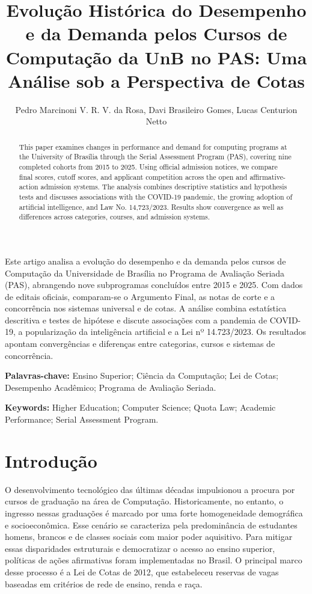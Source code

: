 \documentclass[12pt]{article}
\title{Evolução Histórica do Desempenho e da Demanda pelos Cursos de Computação da UnB no PAS: Uma Análise sob a Perspectiva de Cotas}
\author{Pedro Marcinoni V. R. V. da Rosa\inst{1}, Davi Brasileiro Gomes\inst{1}, Lucas Centurion Netto\inst{1}}
\begin{document}
\maketitle

\begin{abstract}
This paper examines changes in performance and demand for computing programs at the University of Brasília through the Serial Assessment Program (PAS), covering nine completed cohorts from 2015 to 2025. Using official admission notices, we compare final scores, cutoff scores, and applicant competition across the open and affirmative-action admission systems. The analysis combines descriptive statistics and hypothesis tests and discusses associations with the COVID-19 pandemic, the growing adoption of artificial intelligence, and Law No. 14,723/2023. Results show convergence as well as differences across categories, courses, and admission systems.
\end{abstract}

\begin{resumo}
Este artigo analisa a evolução do desempenho e da demanda pelos cursos de Computação da Universidade de Brasília no Programa de Avaliação Seriada (PAS), abrangendo nove subprogramas concluídos entre 2015 e 2025. Com dados de editais oficiais, comparam-se o Argumento Final, as notas de corte e a concorrência nos sistemas universal e de cotas. A análise combina estatística descritiva e testes de hipótese e discute associações com a pandemia de COVID-19, a popularização da inteligência artificial e a Lei nº 14.723/2023. Os resultados apontam convergências e diferenças entre categorias, cursos e sistemas de concorrência.
\end{resumo}

\noindent\textbf{Palavras-chave:} Ensino Superior; Ciência da Computação; Lei de Cotas; Desempenho Acadêmico; Programa de Avaliação Seriada.

\noindent\textbf{Keywords:} Higher Education; Computer Science; Quota Law; Academic Performance; Serial Assessment Program.

\section{Introdução}

O desenvolvimento tecnológico das últimas décadas impulsionou a procura por cursos de graduação na área de Computação. Historicamente, no entanto, o ingresso nessas graduações é marcado por uma forte homogeneidade demográfica e socioeconômica. Esse cenário se caracteriza pela predominância de estudantes homens, brancos e de classes sociais com maior poder aquisitivo. Para mitigar essas disparidades estruturais e democratizar o acesso ao ensino superior, políticas de ações afirmativas foram implementadas no Brasil. O principal marco desse processo é a Lei de Cotas de 2012, que estabeleceu reservas de vagas baseadas em critérios de rede de ensino, renda e raça.
\end{document}
